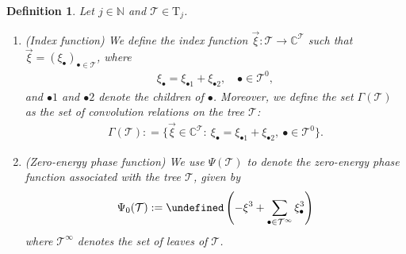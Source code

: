 \documentclass[a4paper,
11pt,  reqno]{amsart}
\newcommand{\5}{\textup{V}}
\newtheorem{definition}[theorem]{Definition}
\theoremstyle{remark}
\newcommand{\CC}{\mathbb{C}}
\newcommand{\bul}{\bullet}
\let\Re=\undefined\DeclareMathOperator*{\Re}{Re}
\newcommand{\TT}{\mathcal{T}}
\newcommand{\Tr}{\mathrm{T}}
\newcommand{\G}{\Gamma}
\newcommand{\N}{\mathbb{N}}
\numberwithin{equation}{section}
\numberwithin{theorem}{section}
\providecommand{\DIFaddtex}[1]{{\protect\color{blue}\uwave{#1}}} %
\providecommand{\DIFdeltex}[1]{{\protect\color{red}\sout{#1}}}                      %
\providecommand{\DIFaddbegin}{} %
\providecommand{\DIFaddend}{} %
\providecommand{\DIFdelbegin}{} %
\providecommand{\DIFdelend}{} %
\providecommand{\DIFadd}[1]{\texorpdfstring{\DIFaddtex{#1}}{#1}} %
\providecommand{\DIFdel}[1]{\texorpdfstring{\DIFdeltex{#1}}{}} %
\begin{document}
\begin{definition}\rm 

Let $j\in\N$ and $\TT \in \Tr_j$. 

\begin{enumerate}
\item[(i)] (Index function) 
We define the index function $\vec\xi : \TT\to \CC^\TT$ such that $\vec\xi = (\xi_\bul)_{\bul\in\TT}$, where
\begin{align}
\label{parent}
\xi_\bul = \xi_{\bul1} + \xi_{\bul2}, \quad \bul\in \TT^0,
\end{align}
and $\bul1$ and $\bul2$ denote the children of $\bul$. Moreover, we define the set $\G(\TT)$ as the set of convolution relations on the tree $\TT$:
\begin{align}
\label{Gamma}
\G(\TT) : = \big\{ \vec\xi \in \CC^\TT: \ \xi_\bul = \xi_{\bul1} + \xi_{\bul2}, \ \bul \in \TT^0 \big\}. 
\end{align}


\smallskip

\item[(ii)] (Zero-energy phase function) 
We use \DIFdelbegin \DIFdel{$\Psi(\TT)$ }\DIFdelend \DIFaddbegin \DIFadd{$\Psi_0(\TT)$ }\DIFaddend to denote the \textit{zero-energy phase function} associated with the tree $\TT$, given by
\begin{align}
\label{psi0-tree}
\Psi_0(\TT)
:=
\Re\left(- \xi^3 + \sum_{\bul\in \TT^\infty} \xi_\bul^3\right)
\end{align}
where $\TT^\infty$ denotes the set of leaves of $\TT$. 



\end{enumerate}
\end{definition}
\end{document}
